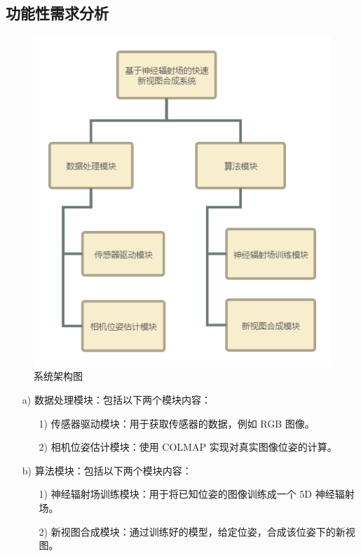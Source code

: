 \subsection{功能性需求分析}
\begin{figure}[htbp]
    \centering
    \includegraphics[width=0.95\linewidth]{figures/system_struct.png}
    \caption{系统架构图}
    \label{fig:system_struct}
\end{figure}

\begin{enumerate}
    \item [a)] 数据处理模块：包括以下两个模块内容：
               \begin{enumerate}
                   \item [1)] 传感器驱动模块：用于获取传感器的数据，例如 RGB 图像。
                   \item [2)] 相机位姿估计模块：使用 COLMAP 实现对真实图像位姿的计算。
               \end{enumerate}
    \item [b)] 算法模块：包括以下两个模块内容：
               \begin{enumerate}
                   \item [1)] 神经辐射场训练模块：用于将已知位姿的图像训练成一个 5D 神经辐射场。
                   \item [2)] 新视图合成模块：通过训练好的模型，给定位姿，合成该位姿下的新视图。
               \end{enumerate}        
\end{enumerate}

